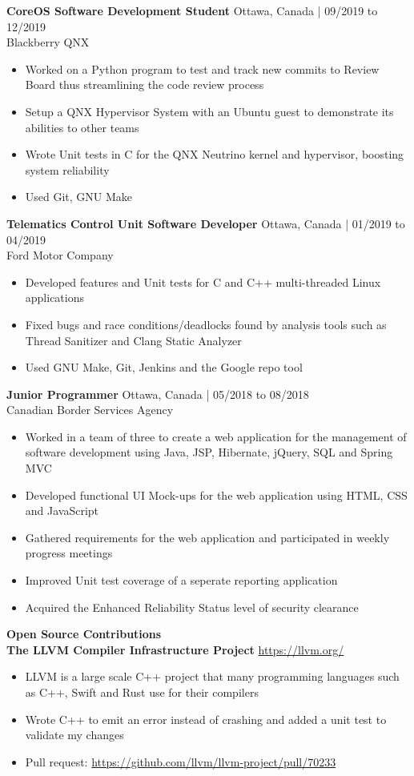 \documentclass[10pt]{article}
\begin{document}
\textbf{CoreOS Software Development Student} \hfill Ottawa, Canada | 09/2019 to 12/2019 \\
Blackberry QNX
\begin{itemize}
    \item Worked on a Python program to test and track new commits to Review Board thus streamlining the code review process
    \item Setup a QNX Hypervisor System with an Ubuntu guest to demonstrate its abilities to other teams
    \item Wrote Unit tests in C for the QNX Neutrino kernel and hypervisor, boosting system reliability
    \item Used Git, GNU Make
\end{itemize}

\textbf{Telematics Control Unit Software Developer} \hfill Ottawa, Canada | 01/2019 to 04/2019 \\
Ford Motor Company
\begin{itemize}[noitemsep]
    \item Developed features and Unit tests for C and C++ multi-threaded Linux applications
    \item Fixed bugs and race conditions/deadlocks found by analysis tools such as Thread Sanitizer and Clang Static Analyzer
    \item Used GNU Make, Git, Jenkins and the Google repo tool
\end{itemize}

\textbf{Junior Programmer} \hfill Ottawa, Canada | 05/2018 to 08/2018 \\
Canadian Border Services Agency
\begin{itemize}
    \item Worked in a team of three to create a web application for the management of software development using Java, JSP, Hibernate, jQuery, SQL and Spring MVC
    \item Developed functional UI Mock-ups for the web application using HTML, CSS and JavaScript
    \item Gathered requirements for the web application and participated in weekly progress meetings
    \item Improved Unit test coverage of a seperate reporting application
    \item Acquired the Enhanced Reliability Status level of security clearance
\end{itemize}

{\Large\textbf{Open Source Contributions}}\space \hrulefill
\\
\textbf{The LLVM Compiler Infrastructure Project} \hfill \url{https://llvm.org/}
\begin{itemize}[noitemsep]
    \item LLVM is a large scale C++ project that many programming languages such as C++, Swift and Rust use for their compilers 
    \item Wrote C++ to emit an error instead of crashing and added a unit test to validate my changes
    \item Pull request: \url{https://github.com/llvm/llvm-project/pull/70233}
\end{itemize} 
\end{document}
